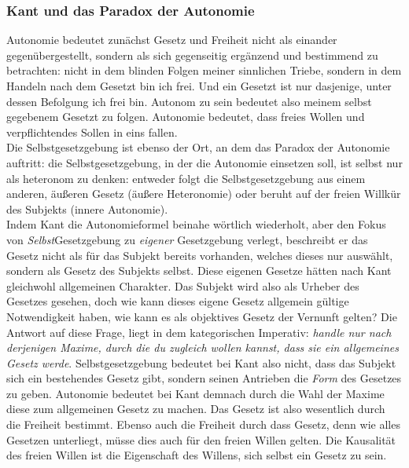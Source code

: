\documentclass[12pt, a4paper, openany]{report}
\begin{document}
\subsubsection{Kant und das Paradox der Autonomie}
Autonomie bedeutet zunächst Gesetz und Freiheit nicht als einander gegenübergestellt, sondern als sich gegenseitig ergänzend und bestimmend zu betrachten: 
nicht in dem blinden Folgen meiner sinnlichen Triebe, sondern in dem Handeln nach dem Gesetzt bin ich frei. 
Und ein Gesetzt ist nur dasjenige, unter dessen Befolgung ich frei bin. 
Autonom zu sein bedeutet also meinem selbst gegebenem Gesetzt zu folgen. 
Autonomie bedeutet, dass freies Wollen und verpflichtendes Sollen in eins fallen.\\
Die Selbstgesetzgebung ist ebenso der Ort, an dem das Paradox der Autonomie auftritt: 
die Selbstgesetzgebung, in der die Autonomie einsetzen soll, ist selbst nur als heteronom zu denken: 
entweder folgt die Selbstgesetzgebung aus einem anderen, äußeren Gesetz (äußere Heteronomie) oder beruht auf der freien Willkür des Subjekts (innere Autonomie).\\
Indem Kant die Autonomieformel beinahe wörtlich wiederholt, aber den Fokus von \textit{Selbst}Gesetzgebung zu \textit{eigener} Gesetzgebung verlegt, beschreibt er das Gesetz nicht als für das Subjekt bereits vorhanden, welches dieses nur auswählt, sondern als Gesetz des Subjekts selbst.
Diese eigenen Gesetze hätten nach Kant gleichwohl allgemeinen Charakter. 
Das Subjekt wird also als Urheber des Gesetzes gesehen, doch wie kann dieses eigene Gesetz allgemein gültige Notwendigkeit haben, wie kann es als objektives Gesetz der Vernunft gelten?
Die Antwort auf diese Frage, liegt in dem kategorischen Imperativ: \glqq \textit{handle nur nach derjenigen Maxime, durch die du zugleich wollen kannst, dass sie ein allgemeines Gesetz werde}\grqq{}.
Selbstgesetzgebung bedeutet bei Kant also nicht, dass das Subjekt sich ein bestehendes Gesetz gibt, sondern \glqq seinen Antrieben die \textit{Form} des Gesetzes zu geben\grqq{}.
Autonomie bedeutet bei Kant demnach durch die Wahl der Maxime diese zum allgemeinen Gesetz zu machen. 
Das Gesetz ist also wesentlich durch die Freiheit bestimmt.
Ebenso auch die Freiheit durch dass Gesetz, denn wie alles Gesetzen unterliegt, müsse dies auch für den freien Willen gelten.
Die Kausalität des freien Willen ist \glqq die Eigenschaft des Willens, sich selbst ein Gesetz zu sein\grqq{}.\\
\end{document}
